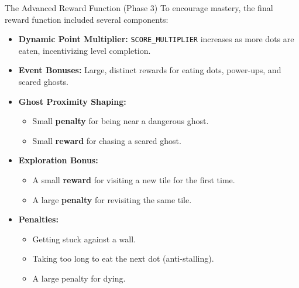 \begin{frame}{The Advanced Reward Function (Phase 3)}
	To encourage mastery, the final reward function included several components:
	
	\begin{itemize}
		\item \textbf{Dynamic Point Multiplier:} \texttt{SCORE\_MULTIPLIER} increases as more dots are eaten, incentivizing level completion.
		\item \textbf{Event Bonuses:} Large, distinct rewards for eating dots, power-ups, and scared ghosts.
		\item \textbf{Ghost Proximity Shaping:}
		\begin{itemize}
			\item Small \textbf{penalty} for being near a dangerous ghost.
			\item Small \textbf{reward} for chasing a scared ghost.
		\end{itemize}
		\item \textbf{Exploration Bonus:}
		\begin{itemize}
			\item A small \textbf{reward} for visiting a new tile for the first time.
			\item A large \textbf{penalty} for revisiting the same tile.
		\end{itemize}
		\item \textbf{Penalties:}
		\begin{itemize}
			\item Getting stuck against a wall.
			\item Taking too long to eat the next dot (anti-stalling).
			\item A large penalty for dying.
		\end{itemize}
	\end{itemize}
\end{frame}